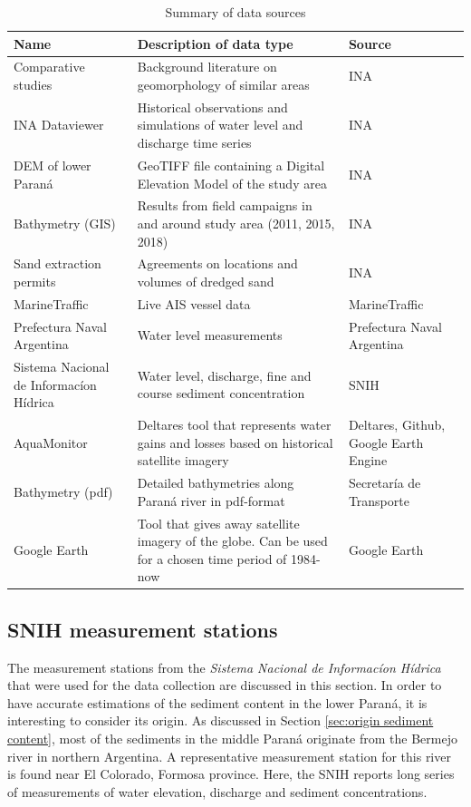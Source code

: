 \begin{table}[H]
    \centering
    \renewcommand{\arraystretch}{1.2} %
    \setlength{\tabcolsep}{4pt}       %
    \begin{tabularx}{\textwidth}{p{3.5cm}p{8cm}p{3.5cm}}
        \toprule
        \textbf{Name} & \textbf{Description of data type} & \textbf{Source} \\
        \midrule
        Comparative studies  & Background literature on geomorphology of similar areas & INA   \\
        INA Dataviewer         & Historical observations and simulations of water level and discharge time series & INA  \\
        DEM of lower Paraná & GeoTIFF file containing a Digital Elevation Model of the study area & INA \\
        Bathymetry (GIS) & Results from field campaigns in and around study area (2011, 2015, 2018) & INA \\
        Sand extraction permits & Agreements on locations and volumes of dredged sand & INA \\
        MarineTraffic & Live AIS vessel data & MarineTraffic \\
        Prefectura Naval Argentina  & Water level measurements & Prefectura Naval Argentina   \\
        Sistema Nacional de Informacíon Hídrica & Water level, discharge, fine and course sediment concentration & SNIH \\
        AquaMonitor & Deltares tool that represents water gains and losses based on historical satellite imagery & Deltares, Github, Google Earth Engine \\
        Bathymetry (pdf) & Detailed bathymetries along Paraná river in pdf-format & Secretaría de Transporte \\
        Google Earth & Tool that gives away satellite imagery of the globe. Can be used for a chosen time period of 1984-now & Google Earth  \\
        \bottomrule
    \end{tabularx}
    \caption{Summary of data sources}
    \label{tab:data collection summary}
\end{table}

\subsection{SNIH measurement stations}
\label{sec:measurementstations}
The measurement stations from the \textit{Sistema Nacional de Informacíon Hídrica} that were used for the data collection are discussed in this section. In order to have accurate estimations of the sediment content in the lower Paraná, it is interesting to consider its origin. As discussed in Section \ref{sec:origin sediment content}, most of the sediments in the middle Paraná originate from the Bermejo river in northern Argentina. A representative measurement station for this river is found near El Colorado, Formosa province. Here, the SNIH reports long series of measurements of water elevation, discharge and sediment concentrations.

